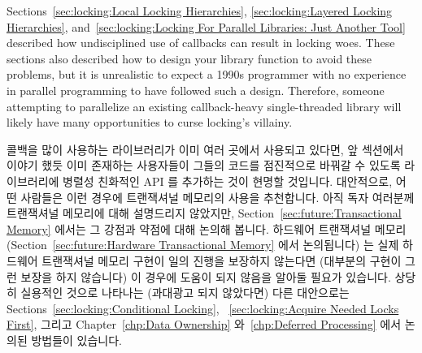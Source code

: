 Sections~\ref{sec:locking:Local Locking Hierarchies},
\ref{sec:locking:Layered Locking Hierarchies},
and~\ref{sec:locking:Locking For Parallel Libraries: Just Another Tool}
described how undisciplined use of callbacks can result in locking
woes.
These sections also described how to design your library function to
avoid these problems, but it is unrealistic to expect a 1990s programmer
with no experience in parallel programming to have followed such a design.
Therefore, someone attempting to parallelize an existing callback-heavy
single-threaded library will likely have many opportunities to curse
locking's villainy.
\fi

콜백을 많이 사용하는 라이브러리가 이미 여러 곳에서 사용되고 있다면, 앞 섹션에서
이야기 했듯 이미 존재하는 사용자들이 그들의 코드를 점진적으로 바꿔갈 수 있도록
라이브러리에 병렬성 친화적인 API 를 추가하는 것이 현명할 것입니다.
대안적으로, 어떤 사람들은 이런 경우에 트랜잭셔널 메모리의 사용을 추천합니다.
아직 독자 여러분께 트랜잭셔널 메모리에 대해 설명드리지 않았지만,
Section~\ref{sec:future:Transactional Memory} 에서는 그 강점과 약점에 대해
논의해 봅니다.
하드웨어 트랜잭셔널 메모리
(Section~\ref{sec:future:Hardware Transactional Memory} 에서 논의됩니다) 는
실제 하드웨어 트랜잭셔널 메모리 구현이 일의 진행을 보장하지 않는다면 (대부분의
구현이 그런 보장을 하지 않습니다) 이 경우에 도움이 되지 않음을 알아둘 필요가
있습니다.
상당히 실용적인 것으로 나타나는 (과대광고 되지 않았다면) 다른 대안으로는 
Sections~\ref{sec:locking:Conditional Locking},
~\ref{sec:locking:Acquire Needed Locks First},
그리고
Chapter~\ref{chp:Data Ownership}
와~\ref{chp:Deferred Processing} 에서 논의된 방법들이 있습니다.

